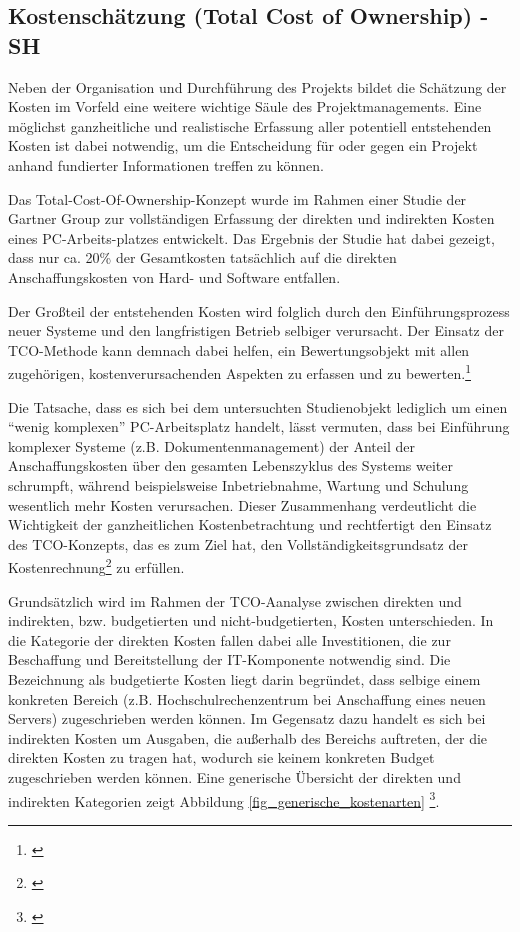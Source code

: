 
\subsection{Kostenschätzung (Total Cost of Ownership) - SH}

\label{subsection_kostenschatzung_TCO}
Neben der Organisation und Durchführung des Projekts bildet die Schätzung der Kosten im Vorfeld 
eine weitere wichtige Säule des Projektmanagements. Eine möglichst ganzheitliche und realistische 
Erfassung aller potentiell entstehenden Kosten ist dabei notwendig, um die Entscheidung für oder 
gegen ein Projekt anhand fundierter Informationen treffen zu können.

Das Total-Cost-Of-Ownership-Konzept wurde im Rahmen einer Studie der Gartner Group 
zur vollständigen Erfassung der direkten und indirekten Kosten eines PC-Arbeits-platzes 
entwickelt. Das Ergebnis der Studie hat dabei gezeigt, dass nur ca. 20\% der Gesamtkosten 
tatsächlich auf die direkten Anschaffungskosten von Hard- und Software entfallen. 

Der Großteil der entstehenden Kosten wird folglich durch den Einführungsprozess neuer 
Systeme und den langfristigen Betrieb selbiger verursacht. Der Einsatz der TCO-Methode 
kann demnach dabei helfen, ein Bewertungsobjekt mit allen zugehörigen, 
kostenverursachenden Aspekten zu erfassen und zu bewerten.\footnote{\cite{hansen_business_2009}}

Die Tatsache, dass es sich bei dem untersuchten Studienobjekt lediglich um einen “wenig komplexen” PC-Arbeitsplatz handelt, lässt vermuten, dass bei Einführung komplexer Systeme (z.B. Dokumentenmanagement) der Anteil der Anschaffungskosten über den gesamten Lebenszyklus des Systems weiter schrumpft, während beispielsweise Inbetriebnahme, Wartung und Schulung wesentlich mehr Kosten verursachen. Dieser Zusammenhang verdeutlicht die Wichtigkeit der ganzheitlichen Kostenbetrachtung und rechtfertigt den Einsatz des TCO-Konzepts, das es zum Ziel hat, den Vollständigkeitsgrundsatz der Kostenrechnung\footnote{\cite{grob_einfuhrung_2004}} zu erfüllen.

Grundsätzlich wird im Rahmen der TCO-Aanalyse zwischen direkten und indirekten, bzw. budgetierten und nicht-budgetierten, Kosten unterschieden. In die Kategorie der direkten Kosten fallen dabei alle Investitionen, die zur Beschaffung und Bereitstellung der IT-Komponente notwendig sind. Die Bezeichnung als budgetierte Kosten liegt darin begründet, dass selbige einem konkreten Bereich (z.B. Hochschulrechenzentrum bei Anschaffung eines neuen Servers) zugeschrieben werden können. Im Gegensatz dazu handelt es sich bei indirekten Kosten um Ausgaben, die außerhalb des Bereichs auftreten, der die direkten Kosten zu tragen hat, wodurch sie keinem konkreten Budget zugeschrieben werden können. Eine generische Übersicht der direkten und indirekten Kategorien zeigt Abbildung \ref{fig_generische_kostenarten} \footnote{\cite{hansen_business_2009}}.


